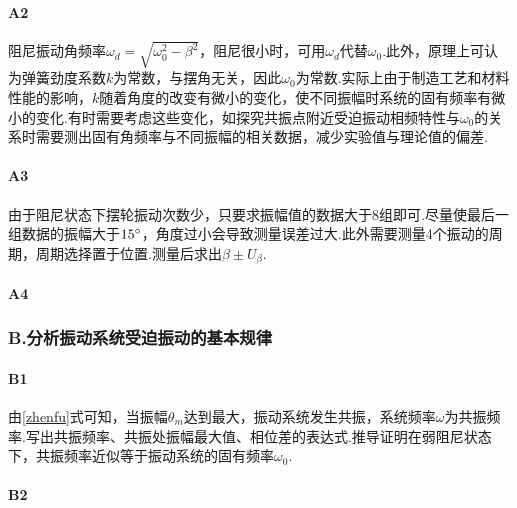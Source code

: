 \documentclass[12pt,a4paper,oneside,left=3.18,right=3.18,top=2.54,bottom=2.54]{ctexart}
\begin{document}
			\paragraph{A2}
				\par
				阻尼振动角频率$\omega_d=\sqrt{\omega_0^2-\beta^2}$，阻尼很小时，可用$\omega_d$代替$\omega_0$.此外，原理上可认为弹簧劲度系数$k$为常数，与摆角无关，因此$\omega_0$为常数.实际上由于制造工艺和材料性能的影响，$k$随着角度的改变有微小的变化，使不同振幅时系统的固有频率有微小的变化.有时需要考虑这些变化，如探究共振点附近受迫振动相频特性与$\omega_0$的关系时需要测出固有角频率与不同振幅的相关数据，减少实验值与理论值的偏差.
			\paragraph{A3}
			\label{p3}
				\par
				由于阻尼状态下摆轮振动次数少，只要求振幅值的数据大于8组即可.尽量使最后一组数据的振幅大于$15^\circ$，角度过小会导致测量误差过大.此外需要测量4个振动的周期，周期选择置于位置.测量后求出$\beta\pm U_\beta$.
			\paragraph{A4}
				\par
		\subsubsection{B.分析振动系统受迫振动的基本规律}
			\paragraph{B1}
				\par
				由\eqref{zhenfu}式可知，当振幅$\theta_m$达到最大，振动系统发生共振，系统频率$\omega$为共振频率.写出共振频率、共振处振幅最大值、相位差的表达式.推导证明在弱阻尼状态下，共振频率近似等于振动系统的固有频率$\omega_0$.
			\paragraph{B2}
				\par
\end{document}
